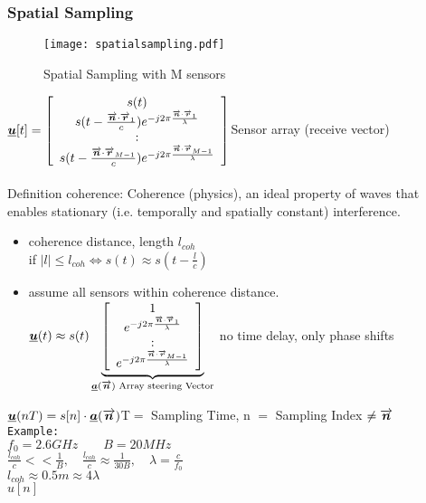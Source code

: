 \subsubsection{Spatial Sampling}
\begin{doublespace}

\begin{figure}[H]
	\centering
	\texttt{[image: spatialsampling.pdf]}
	\caption{Spatial Sampling with M sensors}
	\label{sampling} 
\end{figure}
$\underline{\boldsymbol {u}}[t]= \left[\begin{array}{c}
s(t)\\ s(t-\frac{\overrightarrow{\boldsymbol {n}}\cdot\overrightarrow{\boldsymbol {r}}_1}{c})e^{-j2\pi \frac{\overrightarrow{\boldsymbol {n}}\cdot \overrightarrow{\boldsymbol {r}}_1}{\lambda}}\\ : \\s(t-\frac{\overrightarrow{\boldsymbol {n}}\cdot \overrightarrow{\boldsymbol {r}}_{M-1}}{c})e^{-j2\pi \frac{\overrightarrow{\boldsymbol {n}}\cdot \overrightarrow{\boldsymbol {r}}_{M-1}}{\lambda}} 
\end{array}\right] $\pfeil Sensor array (receive vector)\\ \ \\
Definition coherence: Coherence (physics), an ideal property of waves that enables stationary (i.e. temporally and spatially constant) interference.
\begin{itemize}
	\item coherence distance, length $l_{coh}$\\
				if $|l|\leq l_{coh} \iff s(t) \approx s(t-\frac{l}{c})$ \\
	\item assume all sensors within coherence distance. \\
$\underline{\boldsymbol {u}}(t)\approx s(t) \underbrace{\left[\begin{array}{c}
	1\\ e^{-j2\pi \frac{\overrightarrow{\boldsymbol {n}}\cdot \overrightarrow{\boldsymbol {r}}_1}{\lambda}}\\ : \\ e^{-j2\pi \frac{\overrightarrow{\boldsymbol {n}}\cdot \overrightarrow{\boldsymbol {r}}_{M-1}}{\lambda}}
	\end{array}\right] }_{\underline{\boldsymbol {a}}(\overrightarrow{\boldsymbol {n}})  \text{ Array steering Vector}} $ \pfeil no time delay, only phase shifts
\end{itemize}
$\underline{\boldsymbol {u}}(nT)=s[n]\cdot \underline{\boldsymbol {a}}(\overrightarrow{\boldsymbol {n}})$\with T$=$ Sampling Time, n $=$ Sampling Index $\neq \overrightarrow{\boldsymbol {n}}$ \\
\texttt{Example:}\\
$f_0 = 2.6 GHz\qquad B=20MHz$\\
$\frac{l_{coh}}{c}<< \frac{1}{B}, \quad \frac{l_{coh}}{c}\approx\frac{1}{30B}, \quad \lambda = \frac{c}{f_0}$  \\ $l_{coh}\approx 0.5m \approx 4\lambda$\\ $u[n]$ 
\end{doublespace}

